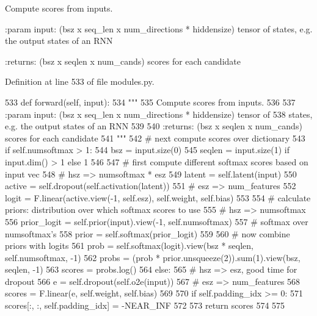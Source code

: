 \begin{DoxyVerb}Compute scores from inputs.

:param input: (bsz x seq_len x num_directions * hiddensize) tensor of
       states, e.g. the output states of an RNN

:returns: (bsz x seqlen x num_cands) scores for each candidate
\end{DoxyVerb}
 

Definition at line 533 of file modules.\+py.


\begin{DoxyCode}
533     \textcolor{keyword}{def }forward(self, input):
534         \textcolor{stringliteral}{"""}
535 \textcolor{stringliteral}{        Compute scores from inputs.}
536 \textcolor{stringliteral}{}
537 \textcolor{stringliteral}{        :param input: (bsz x seq\_len x num\_directions * hiddensize) tensor of}
538 \textcolor{stringliteral}{                       states, e.g. the output states of an RNN}
539 \textcolor{stringliteral}{}
540 \textcolor{stringliteral}{        :returns: (bsz x seqlen x num\_cands) scores for each candidate}
541 \textcolor{stringliteral}{        """}
542         \textcolor{comment}{# next compute scores over dictionary}
543         \textcolor{keywordflow}{if} self.numsoftmax > 1:
544             bsz = input.size(0)
545             seqlen = input.size(1) \textcolor{keywordflow}{if} input.dim() > 1 \textcolor{keywordflow}{else} 1
546 
547             \textcolor{comment}{# first compute different softmax scores based on input vec}
548             \textcolor{comment}{# hsz => numsoftmax * esz}
549             latent = self.latent(input)
550             active = self.dropout(self.activation(latent))
551             \textcolor{comment}{# esz => num\_features}
552             logit = F.linear(active.view(-1, self.esz), self.weight, self.bias)
553 
554             \textcolor{comment}{# calculate priors: distribution over which softmax scores to use}
555             \textcolor{comment}{# hsz => numsoftmax}
556             prior\_logit = self.prior(input).view(-1, self.numsoftmax)
557             \textcolor{comment}{# softmax over numsoftmax's}
558             prior = self.softmax(prior\_logit)
559 
560             \textcolor{comment}{# now combine priors with logits}
561             prob = self.softmax(logit).view(bsz * seqlen, self.numsoftmax, -1)
562             probs = (prob * prior.unsqueeze(2)).sum(1).view(bsz, seqlen, -1)
563             scores = probs.log()
564         \textcolor{keywordflow}{else}:
565             \textcolor{comment}{# hsz => esz, good time for dropout}
566             e = self.dropout(self.o2e(input))
567             \textcolor{comment}{# esz => num\_features}
568             scores = F.linear(e, self.weight, self.bias)
569 
570         \textcolor{keywordflow}{if} self.padding\_idx >= 0:
571             scores[:, :, self.padding\_idx] = -NEAR\_INF
572 
573         \textcolor{keywordflow}{return} scores
574 
575 
\end{DoxyCode}


